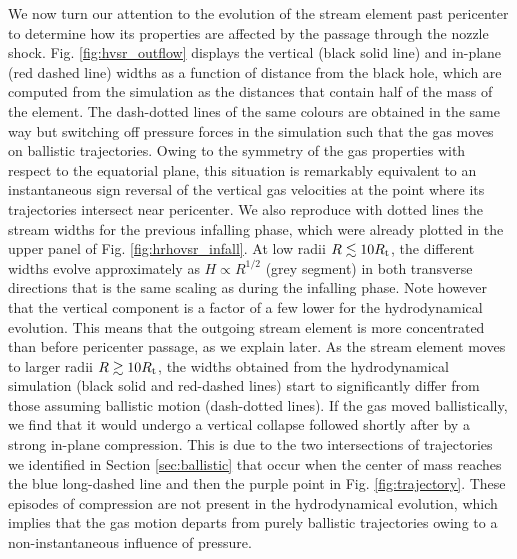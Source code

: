 \documentclass[a4paper,fleqn,usenatbib]{mnras}
\newcommand{\rt}{R_{\rm t}}
\begin{document}
We now turn our attention to the evolution of the stream element past pericenter to determine how its properties are affected by the passage through the nozzle shock. Fig. \ref{fig:hvsr_outflow} displays the vertical (black solid line) and in-plane (red dashed line) widths as a function of distance from the black hole, which are computed from the simulation as the distances that contain half of the mass of the element. The dash-dotted lines of the same colours are obtained in the same way but switching off pressure forces in the simulation such that the gas moves on ballistic trajectories. Owing to the symmetry of the gas properties with respect to the equatorial plane, this situation is remarkably equivalent to an instantaneous sign reversal of the vertical gas velocities at the point where its trajectories intersect near pericenter. We also reproduce with dotted lines the stream widths for the previous infalling phase, which were already plotted in the upper panel of Fig. \ref{fig:hrhovsr_infall}. At low radii $R\lesssim 10 \rt$, the different widths evolve approximately as $H \propto R^{1/2}$ (grey segment) in  both transverse directions that is the same scaling as during the infalling phase. Note however that the vertical component is a factor of a few lower for the hydrodynamical evolution. This means that the outgoing stream element is more concentrated than before pericenter passage, as we explain later. As the stream element moves to larger radii $R\gtrsim 10 \rt$, the widths obtained from the hydrodynamical simulation (black solid and red-dashed lines) start to significantly differ from those assuming ballistic motion (dash-dotted lines). If the gas moved ballistically, we find that it would undergo a vertical collapse followed shortly after by a strong in-plane compression. This is due to the two intersections of trajectories we identified in Section \ref{sec:ballistic} that occur when the center of mass reaches the blue long-dashed line and then the purple point in Fig. \ref{fig:trajectory}. These episodes of compression are not present in the hydrodynamical evolution, which implies that the gas motion departs from purely ballistic trajectories owing to a non-instantaneous influence of pressure. 
\end{document}

